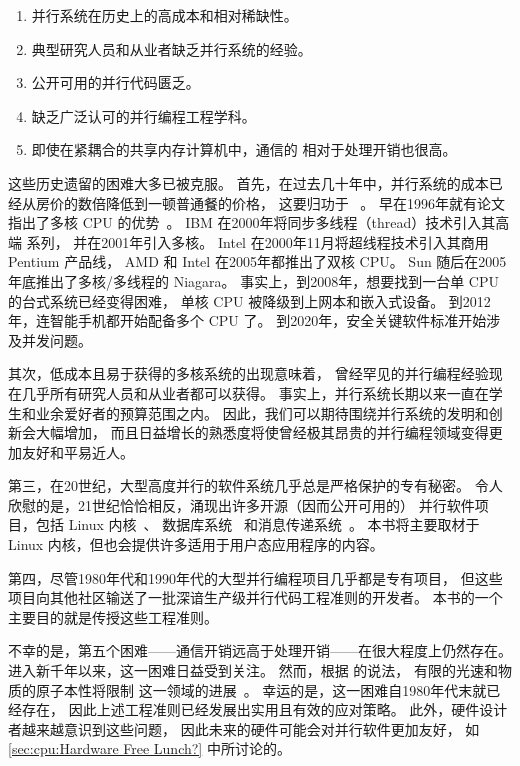 \begin{enumerate}
\item	并行系统在历史上的高成本和相对稀缺性。
\item	典型研究人员和从业者缺乏并行系统的经验。
\item	公开可用的并行代码匮乏。
\item	缺乏广泛认可的并行编程工程学科。
\item	即使在紧耦合的共享内存计算机中，通信的  相对于处理开销也很高。
\end{enumerate}

这些历史遗留的困难大多已被克服。
首先，在过去几十年中，并行系统的成本已经从房价的数倍降低到一顿普通餐的价格，
这要归功于 ~\cite{GordonMoore1965MooresLaw}。
早在1996年就有论文指出了多核 CPU 的优势~\cite{Olukotun96}。
IBM 在2000年将同步多线程（thread）技术引入其高端 \Power{} 系列，
并在2001年引入多核。
Intel 在2000年11月将超线程技术引入其商用 Pentium 产品线，
AMD 和 Intel 在2005年都推出了双核 CPU。
Sun 随后在2005年底推出了多核/多线程的 Niagara。
事实上，到2008年，想要找到一台单 CPU 的台式系统已经变得困难，
单核 CPU 被降级到上网本和嵌入式设备。
到2012年，连智能手机都开始配备多个 CPU 了。
到2020年，安全关键软件标准开始涉及并发问题。

其次，低成本且易于获得的多核系统的出现意味着，
曾经罕见的并行编程经验现在几乎所有研究人员和从业者都可以获得。
事实上，并行系统长期以来一直在学生和业余爱好者的预算范围之内。
因此，我们可以期待围绕并行系统的发明和创新会大幅增加，
而且日益增长的熟悉度将使曾经极其昂贵的并行编程领域变得更加友好和平易近人。

第三，在20世纪，大型高度并行的软件系统几乎总是严格保护的专有秘密。
令人欣慰的是，21世纪恰恰相反，涌现出许多开源（因而公开可用的）
并行软件项目，包括 Linux 内核~\cite{Torvalds2.6kernel}、
数据库系统~\cite{PostgreSQL2008,MySQL2008}
和消息传递系统~\cite{OpenMPI2008,BOINC2008}。
本书将主要取材于 Linux 内核，但也会提供许多适用于用户态应用程序的内容。

第四，尽管1980年代和1990年代的大型并行编程项目几乎都是专有项目，
但这些项目向其他社区输送了一批深谙生产级并行代码工程准则的开发者。
本书的一个主要目的就是传授这些工程准则。

不幸的是，第五个困难——通信开销远高于处理开销——在很大程度上仍然存在。
进入新千年以来，这一困难日益受到关注。
然而，根据  的说法，
有限的光速和物质的原子本性将限制
这一领域的进展~\cite{BryanGardiner2007,GordonMoore03a}。
幸运的是，这一困难自1980年代末就已经存在，
因此上述工程准则已经发展出实用且有效的应对策略。
此外，硬件设计者越来越意识到这些问题，
因此未来的硬件可能会对并行软件更加友好，
如 \cref{sec:cpu:Hardware Free Lunch?} 中所讨论的。

